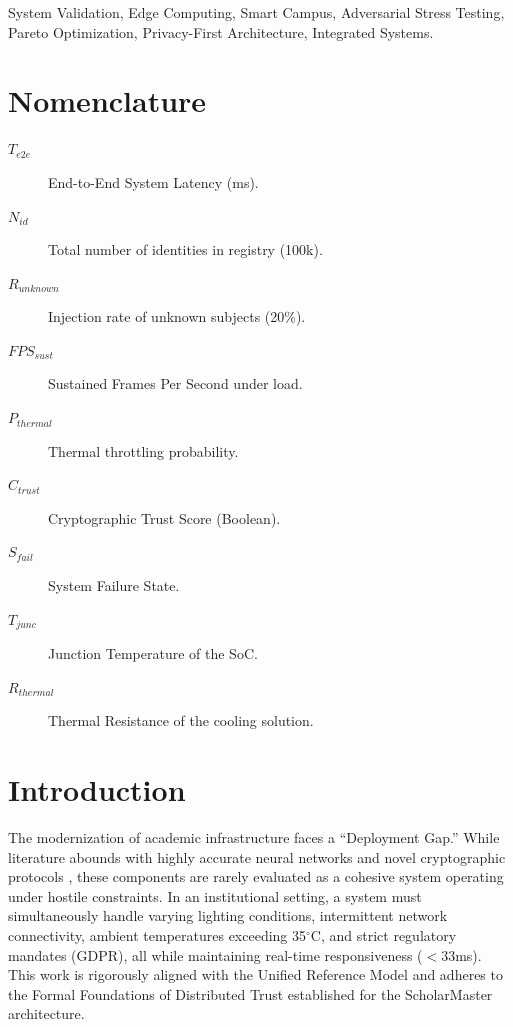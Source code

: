 \documentclass[conference]{IEEEtran}
\begin{document}
\begin{IEEEkeywords}
System Validation, Edge Computing, Smart Campus, Adversarial Stress Testing, Pareto Optimization, Privacy-First Architecture, Integrated Systems.
\end{IEEEkeywords}

\section*{Nomenclature}
\begin{description}
    \item[$T_{e2e}$] End-to-End System Latency (ms).
    \item[$N_{id}$] Total number of identities in registry (100k).
    \item[$R_{unknown}$] Injection rate of unknown subjects (20\%).
    \item[$FPS_{sust}$] Sustained Frames Per Second under load.
    \item[$P_{thermal}$] Thermal throttling probability.
    \item[$C_{trust}$] Cryptographic Trust Score (Boolean).
    \item[$S_{fail}$] System Failure State.
    \item[$T_{junc}$] Junction Temperature of the SoC.
    \item[$R_{thermal}$] Thermal Resistance of the cooling solution.
\end{description}

\section{Introduction}
The modernization of academic infrastructure faces a ``Deployment Gap.'' While literature abounds with highly accurate neural networks \cite{b1, b2} and novel cryptographic protocols \cite{b3}, these components are rarely evaluated as a cohesive system operating under hostile constraints. In an institutional setting, a system must simultaneously handle varying lighting conditions, intermittent network connectivity, ambient temperatures exceeding 35$^\circ$C, and strict regulatory mandates (GDPR), all while maintaining real-time responsiveness ($<33$ms). This work is rigorously aligned with the Unified Reference Model \cite{P20} and adheres to the Formal Foundations of Distributed Trust \cite{P21} established for the ScholarMaster architecture.
\end{document}
